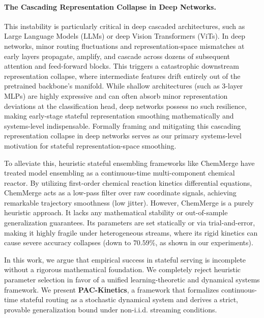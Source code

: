 \paragraph{The Cascading Representation Collapse in Deep Networks.} This instability is particularly critical in deep cascaded architectures, such as Large Language Models (LLMs) or deep Vision Transformers (ViTs). In deep networks, minor routing fluctuations and representation-space mismatches at early layers propagate, amplify, and cascade across dozens of subsequent attention and feed-forward blocks. This triggers a catastrophic downstream representation collapse, where intermediate features drift entirely out of the pretrained backbone's manifold. While shallow architectures (such as 3-layer MLPs) are highly expressive and can often absorb minor representation deviations at the classification head, deep networks possess no such resilience, making early-stage stateful representation smoothing mathematically and systems-level indispensable. Formally framing and mitigating this cascading representation collapse in deep networks serves as our primary systems-level motivation for stateful representation-space smoothing.

To alleviate this, heuristic stateful ensembling frameworks like ChemMerge \cite{chemmerge_2026} have treated model ensembling as a continuous-time multi-component chemical reactor. By utilizing first-order chemical reaction kinetics differential equations, ChemMerge acts as a low-pass filter over raw coordinate signals, achieving remarkable trajectory smoothness (low jitter). However, ChemMerge is a purely heuristic approach. It lacks any mathematical stability or out-of-sample generalization guarantees. Its parameters are set statically or via trial-and-error, making it highly fragile under heterogeneous streams, where its rigid kinetics can cause severe accuracy collapses (down to $70.59\%$, as shown in our experiments).

In this work, we argue that empirical success in stateful serving is incomplete without a rigorous mathematical foundation. We completely reject heuristic parameter selection in favor of a unified learning-theoretic and dynamical systems framework. We present \textbf{PAC-Kinetics}, a framework that formalizes continuous-time stateful routing as a stochastic dynamical system and derives a strict, provable generalization bound under non-i.i.d. streaming conditions.

